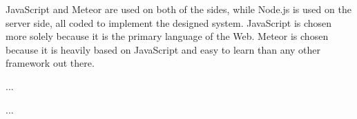 JavaScript and Meteor are used on both of the sides, while Node.js is used on the server side, all coded to implement the designed system.
JavaScript is chosen more solely because it is the primary language of the Web.
Meteor is chosen because it is heavily based on JavaScript and easy to learn than any other framework out there.



...



...

